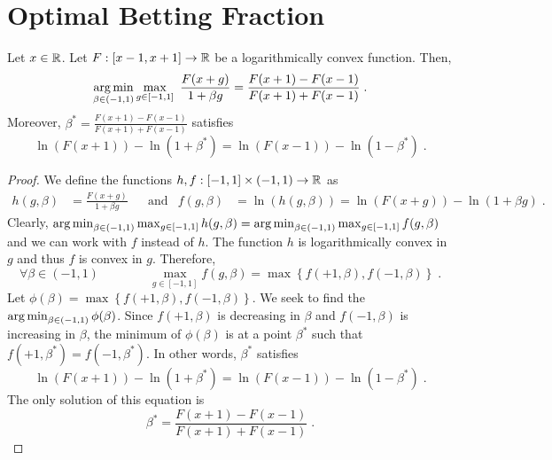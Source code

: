\section{Optimal Betting Fraction}
\label{section:optimal-betting-fraction}

\begin{theorem}
\label{theorem:optimal-betting-fraction}
Let $x \in \mathbb{R}$. Let $F:[x-1,x+1] \to \mathbb{R}$ be a logarithmically convex function. Then,
\[
\operatorname*{arg\,min}_{\beta \in (-1,1)} \max_{g \in [-1,1]} \ \frac{F(x+g)}{1 + \beta g}
= \frac{F(x+1) - F(x-1)}{F(x+1) + F(x-1)} \; .
\]
Moreover, $\beta^*=\frac{F(x+1) - F(x-1)}{F(x+1) + F(x-1)}$ satisfies
\[
\ln(F(x+1)) - \ln(1 + \beta^*) =  \ln(F(x-1)) - \ln(1 - \beta^*) \; .
\]
\end{theorem}

\begin{proof}
We define the functions $h,f:[-1,1] \times (-1,1) \to \mathbb{R}$ as
\begin{align*}
h(g, \beta) & = \frac{F(x+g)}{1 + \beta g} &
& \text{and} &
f(g, \beta) & = \ln (h(g,\beta)) = \ln(F(x+g)) - \ln(1 + \beta g) \; .
\end{align*}
Clearly, $\operatorname*{arg\,min}_{\beta \in (-1,1)} \max_{g \in [-1,1]} h(g,\beta) = \operatorname*{arg\,min}_{\beta \in (-1,1)} \max_{g \in [-1,1]} f(g,\beta)$
and we can work with $f$ instead of $h$. The function $h$ is logarithmically convex
in $g$ and thus $f$ is convex in $g$. Therefore,
\[
\forall \beta \in (-1,1) \qquad \qquad
\max_{g \in [-1,1]} f(g,\beta) = \max \left\{ f(+1,\beta), f(-1,\beta) \right\} \; .
\]
Let $\phi(\beta) = \max \left\{ f(+1,\beta), f(-1,\beta) \right\}$. We seek to
find the $\operatorname*{arg\,min}_{\beta \in (-1,1)} \phi(\beta)$. Since $f(+1,\beta)$ is decreasing
in $\beta$ and $f(-1,\beta)$ is increasing in $\beta$, the minimum of
$\phi(\beta)$ is at a point $\beta^*$ such that $f(+1,\beta^*) = f(-1,\beta^*)$.
In other words, $\beta^*$ satisfies
\[
\ln(F(x+1)) - \ln(1 + \beta^*) =  \ln(F(x-1)) - \ln(1 - \beta^*) \; .
\]
The only solution of this equation is
\[
\beta^* = \frac{F(x+1) - F(x-1)}{F(x+1) + F(x-1)} \; .
\]
\end{proof}


